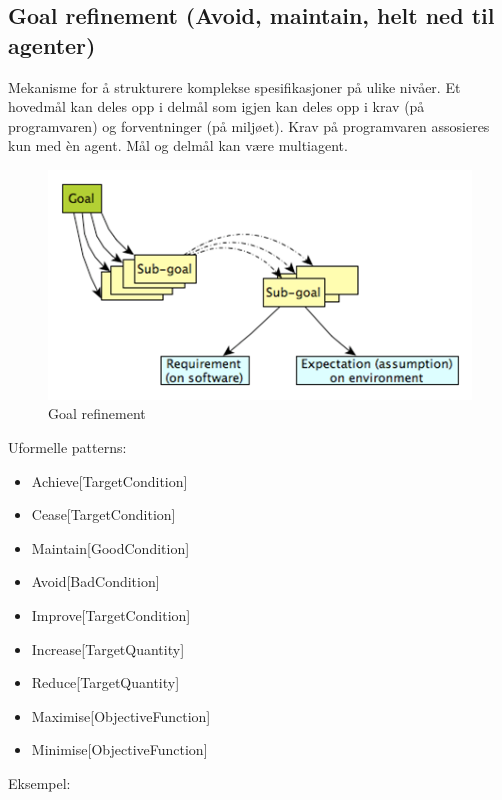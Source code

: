 \subsection{Goal refinement (Avoid, maintain, helt ned til agenter)}

Mekanisme for å strukturere komplekse spesifikasjoner på ulike nivåer.
Et hovedmål kan deles opp i delmål som igjen kan deles opp i krav (på
programvaren) og forventninger (på miljøet). Krav på programvaren
assosieres kun med èn agent. Mål og delmål kan være multiagent.

\begin{figure}[htbp]
\centering
\includegraphics{Forelesning 02/img/3.png}
\caption{Goal refinement}
\end{figure}

Uformelle patterns:

\begin{itemize}
\item
  Achieve{[}TargetCondition{]}
\item
  Cease{[}TargetCondition{]}
\item
  Maintain{[}GoodCondition{]}
\item
  Avoid{[}BadCondition{]}
\item
  Improve{[}TargetCondition{]}
\item
  Increase{[}TargetQuantity{]}
\item
  Reduce{[}TargetQuantity{]}
\item
  Maximise{[}ObjectiveFunction{]}
\item
  Minimise{[}ObjectiveFunction{]}
\end{itemize}
Eksempel:

